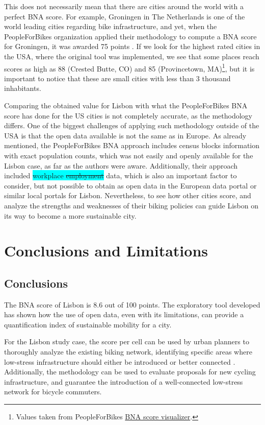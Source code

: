 \documentclass[information,article,submit,moreauthors,Latex,dvi2pdf,10pt,a4paper]{Definitions/mdpi}
\begin{document}
\bigskip

This does not necessarily mean that there are cities around the world with a perfect BNA score. For example, Groningen in The Netherlands is one of the world leading cities regarding bike infrastructure, and yet, when the PeopleForBikes organization applied their methodology to compute a BNA score for Groningen, it was awarded 75 points \cite{Boldry2017}. If we look for the highest rated cities in the USA, where the original tool was implemented, we see that some places reach scores as high as 88 (Crested Butte, CO) and 85 (Provincetown, MA)\footnote{Values taken from PeopleForBikes \protect\href{http://bna.peopleforbikes.org/}{BNA score visualizer}.}, but it is important to notice that these are small cities with less than 3 thousand inhabitants.

Comparing the obtained value for Lisbon with what the PeopleForBikes BNA score has done for the US cities is not completely accurate, as the methodology differs. One of the biggest challenges of applying such methodology outside of the USA is that the open data available is not the same as in Europe. As already mentioned, the PeopleForBikes BNA approach includes census blocks information with exact population counts, which was not easily and openly available for the Lisbon case, as far as the authors were aware. Additionally, their approach included \colorbox{cyan}{workplace \sout{employment}} data, which is also an important factor to consider, but not possible to obtain as open data in the European data portal or similar local portals for Lisbon. Nevertheless, to see how other cities score, and analyze the strengths and weaknesses of their biking policies can guide Lisbon on its way to become a more sustainable city.

\section{Conclusions and Limitations} \label{conclusion}

\subsection{Conclusions}
The BNA score of Lisbon is 8.6 out of 100 points. The exploratory tool developed has shown how the use of open data, even with its limitations, can provide a quantification index of sustainable mobility for a city.
\begin{mycolorbox}[colback=orange]
For the Lisbon study case, the score per cell can be used by urban planners to thoroughly analyze the existing biking network, identifying specific areas where low-stress infrastructure should either be introduced or better connected . Additionally, the methodology can be used to evaluate proposals for new cycling infrastructure, and guarantee the introduction of a well-connected low-stress network for bicycle commuters.
\end{mycolorbox}
\end{document}
